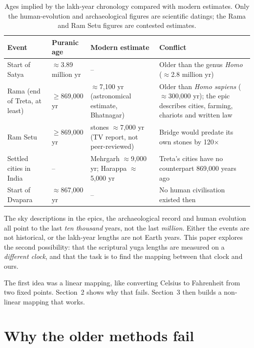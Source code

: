 \documentclass[11pt,a4paper]{article}
\begin{document}
\begin{table}[H]
\centering
\small
\begin{tabularx}{\textwidth}{@{}>{\raggedright}p{2.9cm}>{\raggedright}p{2.2cm}>{\raggedright}p{3.6cm}>{\raggedright\arraybackslash}X@{}}
\toprule
Event & Puranic age & Modern estimate & Conflict \\
\midrule
Start of Satya & $\approx$3.89 million yr & -- & Older than the genus \emph{Homo} ($\approx$2.8 million yr) \\
Rama (end of Treta, at least) & $\ge$869{,}000 yr & $\approx$7{,}100 yr (astronomical estimate, Bhatnagar) & Older than \emph{Homo sapiens} ($\approx$300{,}000 yr); the epic describes cities, farming, chariots and written law \\
Ram Setu & $\ge$869{,}000 yr & stones $\approx$7{,}000 yr (TV report, not peer-reviewed) & Bridge would predate its own stones by 120$\times$ \\
Settled cities in India & -- & Mehrgarh $\approx$9{,}000 yr; Harappa $\approx$5{,}000 yr & Treta's cities have no counterpart 869{,}000 years ago \\
Start of Dvapara & $\approx$867{,}000 yr & -- & No human civilisation existed then \\
\bottomrule
\end{tabularx}
\caption{Ages implied by the lakh-year chronology compared with modern estimates. Only the human-evolution and archaeological figures are scientific datings; the Rama and Ram Setu figures are contested estimates.}
\end{table}

\noindent The sky descriptions in the epics, the archaeological record and human evolution all point to the last \emph{ten thousand} years, not the last \emph{million}. Either the events are not historical, or the lakh-year lengths are not Earth years. This paper explores the second possibility: that the scriptural yuga lengths are measured on a \emph{different clock}, and that the task is to find the mapping between that clock and ours.

The first idea was a linear mapping, like converting Celsius to Fahrenheit from two fixed points. Section~2 shows why that fails. Section~3 then builds a non-linear mapping that works.

\section{Why the older methods fail}
\end{document}
